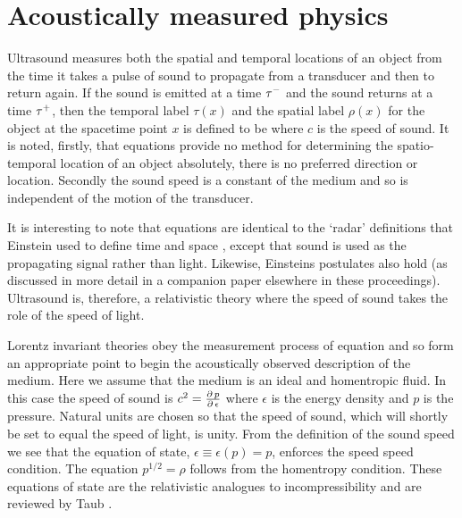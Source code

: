 





\section{Acoustically measured physics}\label{sec:measurement}

Ultrasound measures both the spatial and temporal locations of an object from the time
it takes a pulse of sound to propagate from a transducer and then to return again.
If the sound is emitted  at a time $\tau^-$ and the sound returns at a time  $\tau^+$,
then the temporal label $\tau(x)$ and the spatial label $\rho(x)$  for the object at the spacetime point $x$ is defined to be
where $c$ is the speed of sound.
It is noted, firstly, that equations  provide no method for determining the spatio-temporal location of an object absolutely,
there is no preferred direction or location.
Secondly the sound speed is a constant of the medium and so is independent of the motion of the transducer.

It is  interesting to note that equations  are identical  to the `radar' definitions that Einstein used to define time and space \cite{Dolby2001},
except that sound is used as the propagating signal rather than light.
Likewise, Einsteins postulates also hold (as discussed in more detail in a companion paper elsewhere in these proceedings).
Ultrasound is, therefore, a relativistic theory where the speed of sound takes the role of the speed of light.

Lorentz invariant theories obey the measurement process of equation 
and so form an appropriate point to begin the acoustically observed description of the medium.
Here we assume that the medium is an ideal and homentropic fluid.
In this case the speed of sound is $c^2 = \frac{\operatorname{\partial} p}{\operatorname{\partial} \epsilon}$
where $\epsilon$ is the energy density and $p$ is the pressure.
Natural units are chosen so that the speed of sound, which will shortly be set to equal the speed of light, is unity.
From the definition of the sound speed we see that  the equation of state, $\epsilon \equiv \epsilon(p) = p$,
enforces the speed speed condition.
The equation  $p^{1/2} = \rho$ follows from the homentropy condition.
These equations of state are the relativistic analogues to incompressibility and are  reviewed by  Taub \cite{Taub1978}.

